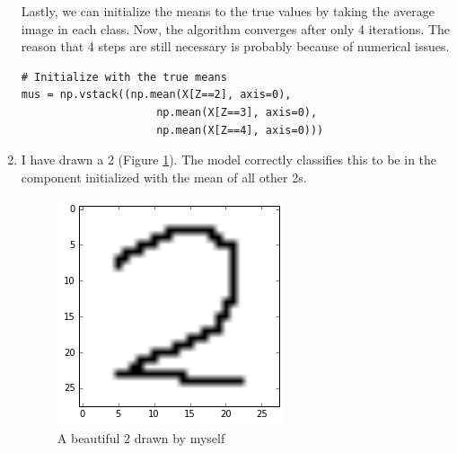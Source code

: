 \documentclass[a4paper]{article}
\begin{document}
\begin{enumerate}
Lastly, we can initialize the means to the true values by taking the average image in each class. Now, the algorithm converges after only 4 iterations. The reason that 4 steps are still necessary is probably because of numerical issues.
\begin{lstlisting}
# Initialize with the true means
mus = np.vstack((np.mean(X[Z==2], axis=0),
                     np.mean(X[Z==3], axis=0),
                     np.mean(X[Z==4], axis=0)))
\end{lstlisting}

\item I have drawn a 2 (Figure \ref{fig:mydigit}). The model correctly classifies this to be in the component initialized with the mean of all other 2s.

\begin{figure}
\centering
\includegraphics[width=.3\linewidth]{figures/mydigit.png}
\caption{A beautiful 2 drawn by myself}
\label{fig:mydigit}
\end{figure}
\end{enumerate}
\end{document}
